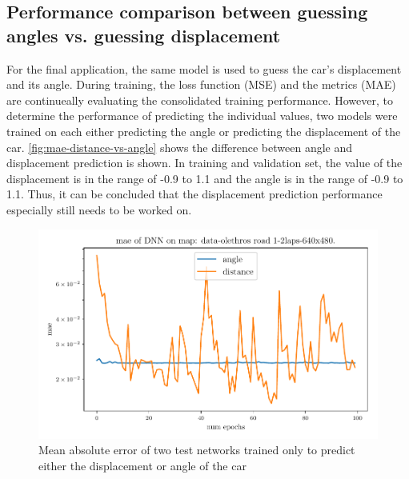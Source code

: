 \documentclass[10pt,a4paper,twoside,journal]{IEEEtran}
\begin{document}
\subsection{Performance comparison between guessing angles vs. guessing displacement}
For the final application, the same model is used to guess the car's displacement and its angle. During training, the loss function (MSE) and the metrics (MAE) are continueally evaluating the consolidated training performance. However, to determine the performance of predicting the individual values, two models were trained on each either predicting the angle or predicting the displacement of the car. \autoref{fig:mae-distance-vs-angle} shows the difference between angle and displacement prediction is shown. In training and validation set, the value of the displacement is in the range of -0.9 to 1.1 and the angle is in the range of -0.9 to 1.1. Thus, it can be concluded that the displacement prediction performance especially still needs to be worked on. 

\begin{figure}[ht]
	\centering
	\includegraphics[width=\columnwidth]{attachments/alexnet-val_mae-angle_dist_comp-05425-86589.pdf}
	\caption{Mean absolute error of two test networks trained only to predict either the displacement or angle of the car}
	\label{fig:mae-distance-vs-angle}
\end{figure}
\end{document}
